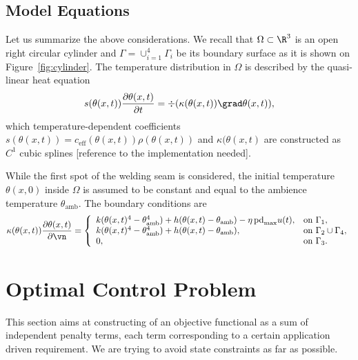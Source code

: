 \subsection{Model Equations}
\label{subsec:equations}

Let us summarize the above considerations.
We recall that $\Omega\subset \R^3$ is an open right circular cylinder and $\Gamma = \cup_{i=1}^4 \Gamma_i$ be its boundary surface as it is shown on Figure~\ref{fig:cylinder}. The temperature distribution in $\Omega$ is described by the quasi-linear heat equation
\begin{equation} \label{eq:heat_eq}
	s(\theta(x,t)) \frac{\partial \theta(x,t)}{\partial t} = \div (\kappa(\theta(x,t)) \grad\theta(x,t)),
\end{equation}
which temperature-dependent coefficients $s(\theta(x,t)) = c_\text{eff}(\theta(x,t)) \rho(\theta(x,t))$ and $\kappa(\theta(x,t)$ are constructed as $C^1$ cubic splines [reference to the implementation needed].

While the first spot of the welding seam is considered, the initial temperature $\theta(x,0)$ inside $\Omega$ is assumed to be constant and equal to the ambience temperature $\theta_\text{amb}$.
The boundary conditions are
\begin{equation} \label{eq:heat_eq_bc}
	\kappa(\theta(x,t)) \frac{\partial \theta(x,t)}{\partial \vn} = \left\{
		\begin{array}{ll}
			k (\theta(x,t)^4 - \theta_\text{amb}^4) + h (\theta(x,t) - \theta_\text{amb}) - \eta\, \text{pd}_{\max} u(t), & \text{on}\ \Gamma_1, \\
			k (\theta(x,t)^4 - \theta_\text{amb}^4) + h (\theta(x,t) - \theta_\text{amb}), & \text{on}\ \Gamma_2 \cup \Gamma_4, \\
			0, & \text{on}\ \Gamma_3.
		\end{array} \right.
\end{equation}

\section{Optimal Control Problem}
\label{sec:objective}

This section aims at constructing of an objective functional as a sum of independent penalty terms, each term corresponding to a certain application driven requirement.
We are trying to avoid state constraints as far as possible.

